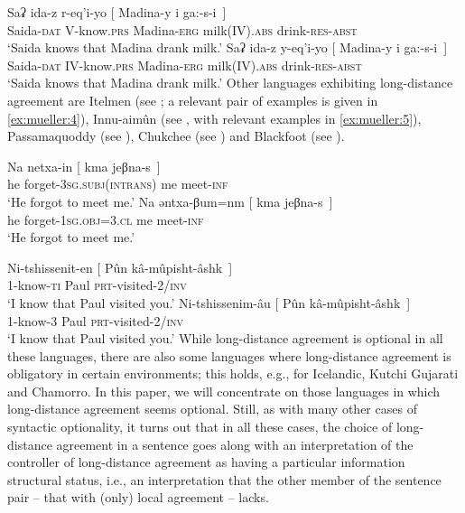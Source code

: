 \documentclass[output=paper
,modfonts
,nonflat]{langsci/langscibook}
\begin{document}
	\ea\label{ex:mueller:3} 
	\ea \label{ex:mueller:3a}
	\gll Saʡ ida-z r-eq'i-yo [\sub{$\alpha$} Madina-y \textgamma i ga:-s-\textbeltl i~] \\
	Saida-{\scshape dat} {V}-know.{\scshape prs} {} {} Madina-{\scshape erg} milk(IV).{\scshape abs} drink-{\scshape res-abst} \\ 
	\glt `Saida knows that Madina drank milk.'
	\ex \label{ex:mueller:3b}
	\gll  Saʡ ida-z y-eq'i-yo [\sub{$\alpha$} \label{3-b}Madina-y \textgamma i ga:-s-\textbeltl i~] \\
	Saida-{\scshape dat} {IV}-know.{\scshape prs} {} {} Madina-{\scshape erg} milk({IV}).{\scshape abs} drink-{\scshape res-abst} \\
	\glt  `Saida knows that Madina drank milk.' 
	\z
	\z
	Other languages exhibiting long-distance agreement are Itelmen (see
	\citealt{BobaljikWurmbrand:05}; a relevant pair of examples is given in
	\ref{ex:mueller:4}), Innu-aim\^{u}n (see \citealt{BraniganMacKenzie:02}, with
	relevant examples in \ref{ex:mueller:5}), Passamaquoddy (see \citealt{Bruening:01}),
	Chukchee (see \citealt{Boskovic:07}) and Blackfoot (see \citealt{Bliss:09}).
	
	\ea\label{ex:mueller:4} 
	\ea 
	\gll Na netxa-in [\sub{$\alpha$} kma jeβna-s~] \\
	he forget-{{\scshape 3sg.subj(intrans)}} {} me meet-{\scshape inf} \\
	\glt  `He forgot to meet me.'
	\ex
	\gll Na əntxa-βum=nm [\sub{$\alpha$} kma jeβna-s~] \\
	he forget-{{\scshape 1sg.obj=3.cl}} {} {me} meet-{\scshape inf} \\
	\glt `He forgot to meet me.' 
	\z 
	\z
	
	\ea\label{ex:mueller:5}
	\ea 
	\gll Ni-tshissenit-en [\sub{$\alpha$} P\^{u}n k\^{a}-m\^{u}pisht-\^{a}shk~] \\
	1-know-{{\scshape ti}} {} Paul {\scshape prt}-visited-2/{\scshape inv} \\
	\glt `I know that Paul visited you.'
	\ex
	\gll Ni-tshissenim-{\^a}u [\sub{$\alpha$} P\^{u}n k\^{a}-m\^{u}pisht-\^{a}shk~] \\
	1-know-{3} {} {Paul} {\scshape prt}-visited-2/{\scshape inv} \\
	\glt `I know that Paul visited you.' 
	\z
	\z 
	While long-distance agreement is optional in all these languages,
	there are also some languages where long-distance agreement is
	obligatory in certain environments; this holds, e.g., for Icelandic,
	Kutchi Gujarati and Chamorro.  In this paper, we will concentrate on
	those languages in which long-distance agreement seems
	optional. Still, as with many other cases of syntactic optionality, it
	turns out that in all these cases, the choice of long-distance
	agreement in a sentence goes along with an interpretation of the
	controller of long-distance agreement as having a particular
	information structural status, i.e., an interpretation that the other
	member of the sentence pair -- that with (only) local agreement --
	lacks. 
	
\end{document}
